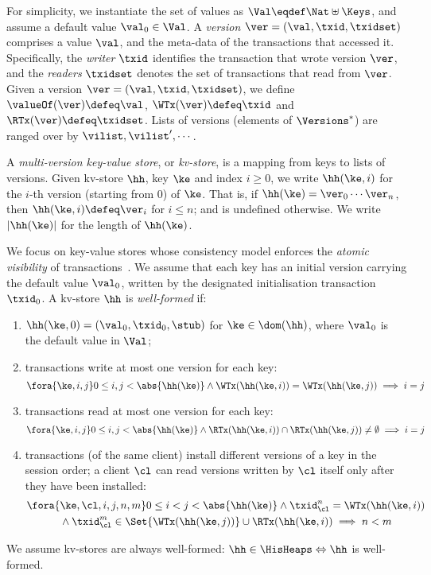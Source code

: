 For simplicity, we instantiate the set of values as  $\Val \eqdef \Nat \uplus \Keys$,
and assume a default value $\val_0 \in \Val$. 
A \emph{version} $\ver = (\val, \txid, \txidset)$ comprises a value $\val$,
and the meta-data of the transactions that accessed it.
Specifically, the \emph{writer} $\txid$ identifies the transaction that wrote version $\ver$, 
and the \emph{readers} $\txidset$ denotes the set of transactions that read from $\ver$.
Given a version $\ver = (\val, \txid, \txidset)$, we define $\valueOf(\ver) \defeq \val$,
$\WTx(\ver) \defeq \txid$ and $\RTx(\ver) \defeq \txidset$.
Lists of versions (\ie elements of $\Versions^{\ast}$) are ranged over by $\vilist, \vilist',\cdots$.

A \emph{multi-version key-value store}, or \emph{kv-store}, 
is a mapping from keys to lists of versions. 
Given kv-store $\hh$, key $\ke$ and index $i \geq 0$, 
we write $\hh(\ke, i)$ for the $i$-th version (starting from $0$) of $\ke$.
That is, if $\hh(\ke) = \ver_0 \cdots\ver_{n}$, then $\hh(\ke, i) \defeq \ver_{i}$ for $i \leq n$; 
and is undefined otherwise. 
We write $\lvert \hh(\ke) \rvert$ for the length of $\hh(\ke)$.

We focus on key-value stores whose consistency model enforces the \emph{atomic visibility} of transactions~\cite{framework-concur}. 
We assume that each key has an initial version carrying the default value $\val_0$, 
written by the designated initialisation transaction $\txid_0$.
A kv-store $\hh$ is \emph{well-formed} if:
\begin{enumerate}%
\item\label{kv:wf.init} 
    $\hh(\ke, 0) = (\val_0, \txid_0, \stub)$ for $\ke \in \dom(\hh)$, where $\val_0$ is the default value in $\Val$;
\item\label{kv:wf.onewrite} 
    transactions write at most one version for each key:
\[
\fora{\ke, i,j }
0 \leq i, j < \abs{ \hh(\ke) }
\land \WTx(\hh(\ke, i)) = \WTx(\hh(\ke, j))
\implies i = j 
\]
\item\label{kv:wf.oneread} 
    transactions read at most one version for each key:
\[
\fora{\ke, i,j } 
0 \leq i, j < \abs{ \hh(\ke) }
\land \RTx(\hh(\ke, i)) \cap \RTx(\hh(\ke, j)) \neq \emptyset 
\implies i = j
\]
\item\label{kv:wf.so} 
	transactions (of the same client) install different versions of a key in the session order; 
    a client $\cl$ can read versions written by $\cl$ itself only after they have been installed:
\begin{multline*}
    \fora{ \ke, \cl, i,j, n, m} 
    0 \leq i < j < \abs{\hh(\ke)} 
    \land \txid_{\cl}^{n} = \WTx(\hh(\ke,i)) \\
    {} \wedge \txid_{\cl}^{m} \in \Set{\WTx(\hh(\ke,j))} \cup \RTx(\hh(\ke, i))
    \implies n < m
\end{multline*}
\end{enumerate}
%
We assume kv-stores are always well-formed: $\hh \in \HisHeaps \Leftrightarrow \hh$  is well-formed.

